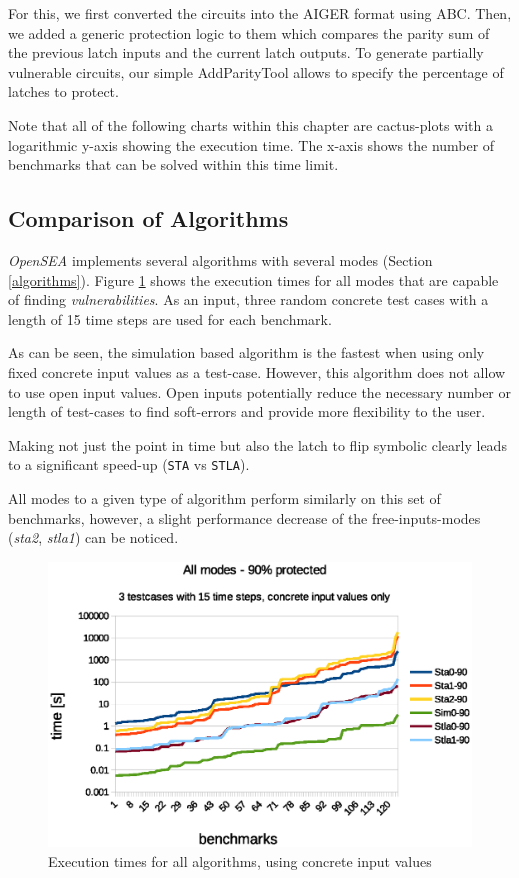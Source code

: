 \documentclass[a4paper,10pt]{article}
\begin{document}
For this, we first converted the circuits into the AIGER format using ABC. Then, we added a generic protection logic to them which compares the parity sum
of the previous latch inputs and the current latch outputs. To generate partially vulnerable circuits, our simple AddParityTool allows to specify the percentage of latches to protect.

Note that all of the following charts within this chapter are cactus-plots with a logarithmic y-axis showing the execution time.
The x-axis shows the number of benchmarks that can be solved within this time limit.


\subsection{Comparison of Algorithms}
\emph{OpenSEA} implements several algorithms with several modes (Section \ref{algorithms}). Figure \ref{all_modes} shows the execution times for all modes that are capable of finding \emph{vulnerabilities}.
As an input, three random concrete test cases with a length of 15 time steps are used for each benchmark.

As can be seen, the simulation based algorithm is the fastest when using only fixed concrete input values as a test-case. However, this algorithm does not allow to use open input values.
Open inputs potentially reduce the necessary number or length of test-cases to find soft-errors and provide more flexibility to the user.

Making not just the point in time but also the latch to flip symbolic clearly leads to a significant speed-up (\texttt{STA} vs \texttt{STLA}).

All modes to a given type of algorithm perform similarly on this set of benchmarks, however, a slight performance decrease of the free-inputs-modes (\emph{sta2}, \emph{stla1}) can be noticed.


\begin{figure}[!htb]
\centering
\includegraphics[scale = 0.5]{img/all_modes.eps}
\centering \caption{Execution times for all algorithms, using concrete input values}
\label{all_modes}
\end{figure}
\end{document}
